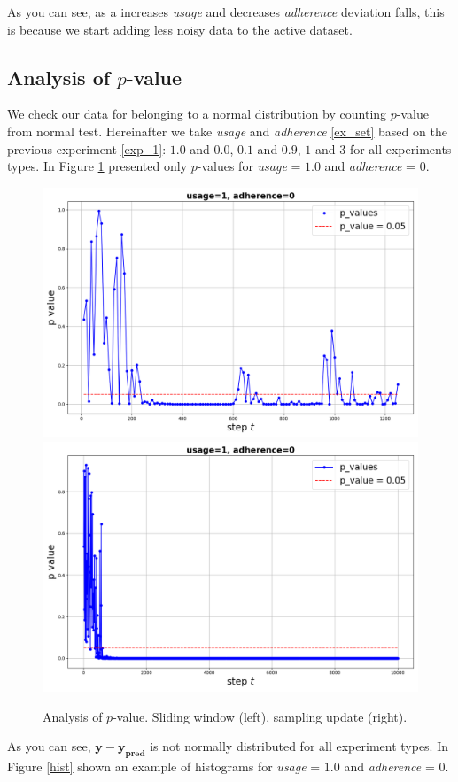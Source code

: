 \documentclass{article}
\begin{document}
        As you can see, as a increases \textit{usage} and decreases \textit{adherence} deviation falls, this is because we start adding less noisy data to the active dataset.
        
    \subsection{Analysis of $p$-value} \label{exp_2}
        We check our data for belonging to a normal distribution by counting $p$-value from normal test. Hereinafter we take \textit{usage} and \textit{adherence} \ref{ex_set} based on the previous experiment \ref{exp_1}: $1.0$ and $0.0$, $0.1$ and $0.9$, $1$ and $3$ for all experiments types. In Figure \ref{p_value} presented only $p$-values for \textit{usage} = $1.0$ and \textit{adherence} = $0$.

        \begin{figure}[h!]
            \centering
            \includegraphics[width=0.49\linewidth]{pictures/p_loop_1_0.png}
            \includegraphics[width=0.49\linewidth]{pictures/p_sample_1_0.png}
            
            \caption{Analysis of $p$-value. Sliding window (left), sampling update (right).}
            \label{p_value}
        \end{figure}

\newpage
        
        As you can see, $\mathbf{y} - \mathbf{y_{\text{pred}}}$ is not normally distributed for all experiment types. In Figure \ref{hist} shown an example of histograms for \textit{usage} = $1.0$ and \textit{adherence} = $0$.
\end{document}
